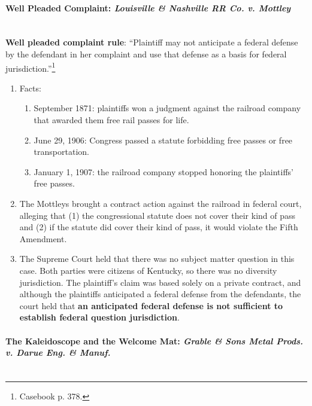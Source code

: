 \paragraph{Well Pleaded Complaint: \emph{Louisville \& Nashville RR Co. v.  
Mottley\\\\}}

\textbf{Well pleaded complaint rule}: ``Plaintiff may not anticipate a federal defense by the defendant in her complaint and use that defense as a basis for federal jurisdiction.''\footnote{Casebook p. 378.}

\begin{enumerate}
    \item Facts:
    \begin{enumerate}
        \item September 1871: plaintiffs won a judgment against the railroad 
        company that awarded them free rail passes for life.
        \item June 29, 1906: Congress passed a statute forbidding free passes 
        or free transportation.
        \item January 1, 1907: the railroad company stopped honoring the 
        plaintiffs' free passes.
    \end{enumerate}
    \item The Mottleys brought a contract action against the railroad in 
    federal court, alleging that (1) the congressional statute does not cover 
    their kind of pass and (2) if the statute did cover their kind of pass, it 
    would violate the Fifth Amendment.
    \item The Supreme Court held that there was no subject matter question in 
    this case. Both parties were citizens of Kentucky, so there was no 
    diversity jurisdiction. The plaintiff's claim was based solely on a 
    private contract, and although the plaintiffs anticipated a federal 
    defense from the defendants, the court held that \textbf{an anticipated 
    federal defense is not sufficient to establish federal question 
    jurisdiction}.
\end{enumerate}

\paragraph{The Kaleidoscope and the Welcome Mat: \emph{Grable \& Sons Metal 
Prods. v. Darue Eng. \& Manuf.\\\\}}

